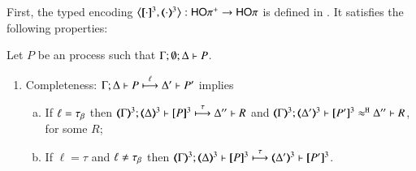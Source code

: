 \documentclass[runningheads]{llncs}
\begin{document}
{%
First, the typed encoding
$\enco{\map{\cdot}^{3}, \mapt{\cdot}^{3}}: \HOpp \to \HOp$ is defined
in .
It satisfies the following properties:


\begin{proposition} %
	\label{prop:op_corr_HOpp_to_HOp}
	Let $P$ be an \HOpp process such that $\Gamma; \emptyset; \Delta \vdash P$.
	\begin{enumerate}[1.]
		\item	Completeness: 
			$\Gamma; \Delta \vdash P \stackrel{\ell}{\longmapsto} \Delta' \vdash P'$ implies
			\begin{enumerate}[a)]
%
				\item	If $\ell = \tau_{\beta}$ then
					$\horel{\tmap{\Gamma}{3}}{\tmap{\Delta}{3}}{\pmap{P}{3}}{\hby{\tau}}
					{\Delta''}{R}$ and
					$\horel{\tmap{\Gamma}{3}}{\tmap{\Delta'}{3}}{\pmap{P'}{3}}{\hwb}{\Delta''}{R}$, for some $R$;

				\item	If $\ell = \tau$ and $\ell \not= \tau_{\beta}$ then %
					$\horel{\tmap{\Gamma}{3}}{\tmap{\Delta}{3}}{\pmap{P}{3}}{\hby{\tau}}
					{\tmap{\Delta'}{3}}{\pmap{P'}{3}}$.
			\end{enumerate}


\end{enumerate}
\end{proposition}}
\end{document}
